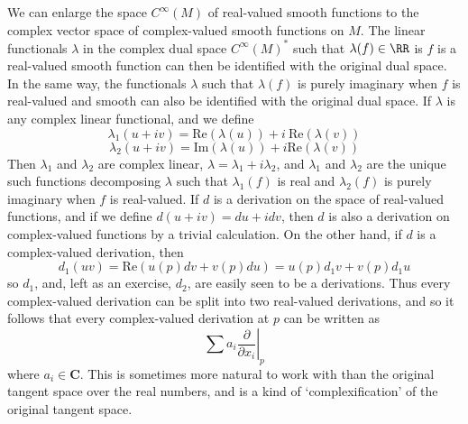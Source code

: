 \begin{remark}
    We can enlarge the space $C^\infty(M)$ of real-valued smooth functions to the complex vector space of complex-valued smooth functions on $M$. The linear functionals $\lambda$ in the complex dual space $C^\infty(M)^*$ such that $\lambda(f) \in \RR$ is $f$ is a real-valued smooth function can then be identified with the original dual space. In the same way, the functionals $\lambda$ such that $\lambda(f)$ is purely imaginary when $f$ is real-valued and smooth can also be identified with the original dual space. If $\lambda$ is any complex linear functional, and we define
    \[ \lambda_1(u + iv) = \text{Re}(\lambda(u)) + i\ \text{Re}(\lambda(v)) \]
    \[ \lambda_2(u + iv) = \text{Im}(\lambda(u)) + i\text{Re}(\lambda(v)) \]
    Then $\lambda_1$ and $\lambda_2$ are complex linear, $\lambda = \lambda_1 + i\lambda_2$, and $\lambda_1$ and $\lambda_2$ are the unique such functions decomposing $\lambda$ such that $\lambda_1(f)$ is real and $\lambda_2(f)$ is purely imaginary when $f$ is real-valued. If $d$ is a derivation on the space of real-valued functions, and if we define $d(u + iv) = du + idv$, then $d$ is also a derivation on complex-valued functions by a trivial calculation. On the other hand, if $d$ is a complex-valued derivation, then
    \[ d_1(uv) = \text{Re}(u(p) dv + v(p) du) = u(p) d_1v + v(p) d_1u \]
    so $d_1$, and, left as an exercise, $d_2$, are easily seen to be a derivations. Thus every complex-valued derivation can be split into two real-valued derivations, and so it follows that every complex-valued derivation at $p$ can be written as
    \[ \sum a_i \left. \frac{\partial}{\partial x_i} \right|_p \]
    where $a_i \in \mathbf{C}$. This is sometimes more natural to work with than the original tangent space over the real numbers, and is a kind of `complexification' of the original tangent space.
\end{remark}

